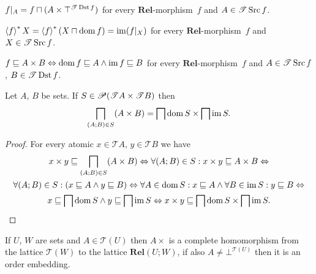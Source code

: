 \begin{obvious}
$f|_{A}=f\sqcap(A\times\top^{\mathscr{T}\operatorname{Dst} f})$ for every $\mathbf{Rel}$-morphism~$f$
and $A\in\mathscr{T}\operatorname{Src} f$.
\end{obvious}

\begin{obvious}
$\left\langle f\right\rangle ^{\ast}X=\left\langle f\right\rangle ^{\ast}(X\sqcap\operatorname{dom} f)=\operatorname{im}(f|_{X})$ for every $\mathbf{Rel}$-morphism~$f$
and $X\in\mathscr{T}\operatorname{Src} f$.
\end{obvious}

\begin{obvious}
$f\sqsubseteq A\times B\Leftrightarrow\operatorname{dom} f\sqsubseteq A\land\operatorname{im} f\sqsubseteq B$
for every $\mathbf{Rel}$-morphism~$f$ and $A\in\mathscr{T}\operatorname{Src} f$,
\textbf{$B\in\mathscr{T}\operatorname{Dst} f$}.\end{obvious}
\begin{thm}
Let $A$, $B$ be sets. If $S\in\mathscr{P}(\mathscr{T}A\times\mathscr{T}B)$
then
\[
\bigsqcap_{(A;B)\in S}(A\times B)=\bigsqcap\operatorname{dom} S\times\bigsqcap\operatorname{im} S.
\]
\end{thm}
\begin{proof}
For every atomic $x\in\mathscr{T}A$, $y\in\mathscr{T}B$ we have
\begin{multline*}
x\times y\sqsubseteq\bigsqcap_{(A;B)\in S}(A\times B)\Leftrightarrow\forall(A;B)\in S:x\times y\sqsubseteq A\times B\Leftrightarrow\\
\forall(A;B)\in S:(x\sqsubseteq A\land y\sqsubseteq B)\Leftrightarrow\forall A\in\operatorname{dom} S:x\sqsubseteq A\land\forall B\in\operatorname{im} S:y\sqsubseteq B\Leftrightarrow\\
x\sqsubseteq\bigsqcap\operatorname{dom} S\land y\sqsubseteq\bigsqcap\operatorname{im} S\Leftrightarrow x\times y\sqsubseteq\bigsqcap\operatorname{dom} S\times\bigsqcap\operatorname{im} S.
\end{multline*}
\end{proof}
\begin{obvious}
If $U$, $W$ are sets and $A\in\mathscr{T}(U)$ then $A\times$ is
a complete homomorphism from the lattice $\mathscr{T}(W)$ to the
lattice $\mathbf{Rel}(U;W)$, if also $A\ne\bot^{\mathscr{T}(U)}$
then it is an order embedding.\end{obvious}

